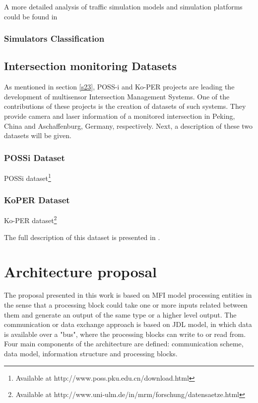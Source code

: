 A more detailed analysis of traffic simulation models and simulation platforms could be found in \cite{AdamsBoxill2000, Barcelo2000, Kitamura2005, Lieberman1992}
\subsubsection{Simulators Classification}
\subsection{Intersection monitoring Datasets}

As mentioned in section \ref{s23}, POSS-i and Ko-PER projects are leading the development of multisensor Intersection Management Systems. One of the contributions of these projects is the creation of datasets of such systems. They provide camera and laser information of a monitored intersection in Peking, China and Aschaffenburg, Germany, respectively. Next, a description of these two datasets will be given.

\subsubsection{POSSi Dataset }

POSSi dataset\footnote{Available at http://www.poss.pku.edu.cn/download.html}
\subsubsection{KoPER Dataset }

Ko-PER dataset\footnote{Available at http://www.uni-ulm.de/in/mrm/forschung/datensaetze.html}

The full description of this dataset is presented in \cite{Strigel2014}.

\section{Architecture proposal}

The proposal presented in this work is based on MFI model processing entities in the sense that a processing block could take one or more inputs related between them and generate an output of the same type or a higher level output. The communication or data exchange approach is based on JDL model, in which data is available over a "bus", where the processing blocks can write to or read from. Four main components of the architecture are defined: communication scheme, data model, information structure and processing blocks. 



